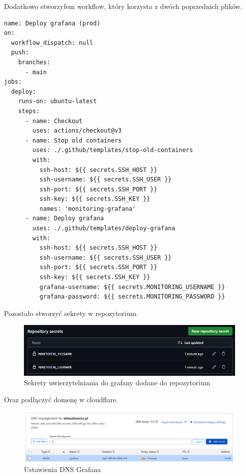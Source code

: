 \documentclass{article}
\begin{document}
Dodatkowo stworzyłem workflow, który korzysta z dwóch poprzednich plików.

\begin{lstlisting}[caption=Plik \texttt{.github/workflows/prod-deploy-grafana.yml}]
name: Deploy grafana (prod)
on:
  workflow_dispatch: null
  push:
    branches:
      - main
jobs:
  deploy:
    runs-on: ubuntu-latest
    steps:
      - name: Checkout
        uses: actions/checkout@v3
      - name: Stop old containers
        uses: ./.github/templates/stop-old-containers
        with:
          ssh-host: ${{ secrets.SSH_HOST }}
          ssh-username: ${{ secrets.SSH_USER }}
          ssh-port: ${{ secrets.SSH_PORT }}
          ssh-key: ${{ secrets.SSH_KEY }}
          names: 'monitoring-grafana'
      - name: Deploy grafana
        uses: ./.github/templates/deploy-grafana
        with:
          ssh-host: ${{ secrets.SSH_HOST }}
          ssh-username: ${{ secrets.SSH_USER }}
          ssh-port: ${{ secrets.SSH_PORT }}
          ssh-key: ${{ secrets.SSH_KEY }}
          grafana-username: ${{ secrets.MONITORING_USERNAME }}
          grafana-password: ${{ secrets.MONITORING_PASSWORD }}
\end{lstlisting}

Pozostało stworzyć sekrety w repozytorium.

\begin{figure}[H]
    \centering
    \includegraphics[width=1\linewidth]{sekretyGrafana.png}
    \caption{Sekrety uwierzytelniania do grafany dodane do repozytorium}
    \label{fig:enter-label}
\end{figure}

Oraz podłączyć domenę w cloudflare.

\begin{figure}[H]
    \centering
    \includegraphics[width=1\linewidth]{grafanaDNS.png}
    \caption{Ustawienia DNS Grafana}
    \label{fig:enter-label}
\end{figure}
\end{document}
